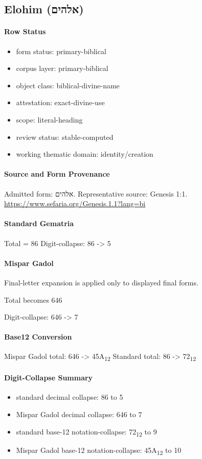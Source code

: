 \subsection{Elohim (אלהים)}
\paragraph{Row Status}
\begin{itemize}
\item form status: primary-biblical
\item corpus layer: primary-biblical
\item object class: biblical-divine-name
\item attestation: exact-divine-use
\item scope: literal-heading
\item review status: stable-computed
\item working thematic domain: identity/creation
\end{itemize}
\paragraph{Source and Form Provenance}
Admitted form: אלהים.
Representative source: Genesis 1:1.
\url{https://www.sefaria.org/Genesis.1.1?lang=bi}
\paragraph{Standard Gematria}
Total = 86
Digit-collapse: 86 -> 5
\paragraph{Mispar Gadol}
Final-letter expansion is applied only to displayed final forms.

Total becomes 646

Digit-collapse: 646 -> 7
\paragraph{Base12 Conversion}
Mispar Gadol total: 646 -> 45A\textsubscript{12}
Standard total: 86 -> 72\textsubscript{12}
\paragraph{Digit-Collapse Summary}
\begin{itemize}
\item standard decimal collapse: 86 to 5
\item Mispar Gadol decimal collapse: 646 to 7
\item standard base-12 notation-collapse: 72\textsubscript{12} to 9
\item Mispar Gadol base-12 notation-collapse: 45A\textsubscript{12} to 10
\end{itemize}
